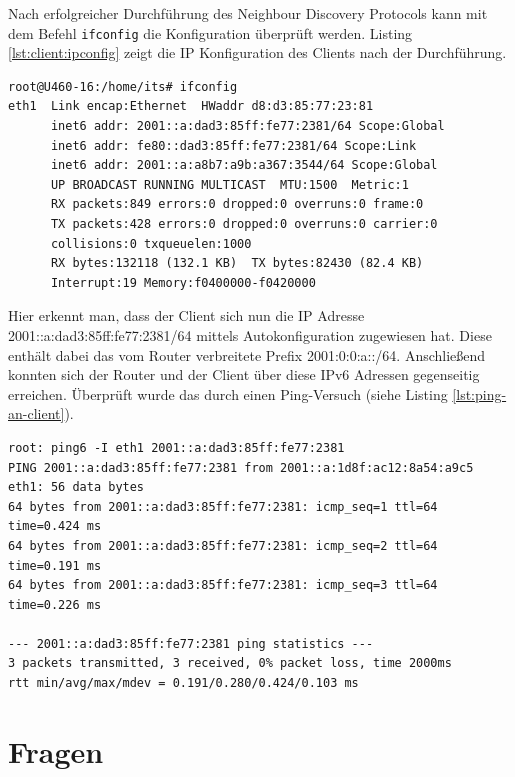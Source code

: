 \documentclass[a4paper,12pt]{article} %
\begin{document}
Nach erfolgreicher Durchführung des Neighbour Discovery Protocols kann mit dem Befehl \verb!ifconfig! die Konfiguration überprüft werden. Listing \ref{lst:client:ipconfig} zeigt die IP Konfiguration des Clients nach der Durchführung.

\begin{lstlisting}[style=code,caption={IP Konfiguration des Clients},label=lst:client:ipconfig]
root@U460-16:/home/its# ifconfig
eth1  Link encap:Ethernet  HWaddr d8:d3:85:77:23:81  
      inet6 addr: 2001::a:dad3:85ff:fe77:2381/64 Scope:Global
      inet6 addr: fe80::dad3:85ff:fe77:2381/64 Scope:Link
      inet6 addr: 2001::a:a8b7:a9b:a367:3544/64 Scope:Global
      UP BROADCAST RUNNING MULTICAST  MTU:1500  Metric:1
      RX packets:849 errors:0 dropped:0 overruns:0 frame:0
      TX packets:428 errors:0 dropped:0 overruns:0 carrier:0
      collisions:0 txqueuelen:1000 
      RX bytes:132118 (132.1 KB)  TX bytes:82430 (82.4 KB)
      Interrupt:19 Memory:f0400000-f0420000  
\end{lstlisting}

Hier erkennt man, dass der Client sich nun die IP Adresse 2001::a:dad3:85ff:fe77:2381/64 mittels Autokonfiguration zugewiesen hat. Diese enthält dabei das vom Router verbreitete Prefix 2001:0:0:a::/64.
Anschließend konnten sich der Router und der Client über diese IPv6 Adressen gegenseitig erreichen. Überprüft wurde das durch einen Ping-Versuch (siehe Listing \ref{lst:ping-an-client}).

\begin{lstlisting}[style=code,caption={Ping an Client},label=lst:ping-an-client]
root: ping6 -I eth1 2001::a:dad3:85ff:fe77:2381
PING 2001::a:dad3:85ff:fe77:2381 from 2001::a:1d8f:ac12:8a54:a9c5 eth1: 56 data bytes
64 bytes from 2001::a:dad3:85ff:fe77:2381: icmp_seq=1 ttl=64 time=0.424 ms
64 bytes from 2001::a:dad3:85ff:fe77:2381: icmp_seq=2 ttl=64 time=0.191 ms
64 bytes from 2001::a:dad3:85ff:fe77:2381: icmp_seq=3 ttl=64 time=0.226 ms

--- 2001::a:dad3:85ff:fe77:2381 ping statistics ---
3 packets transmitted, 3 received, 0% packet loss, time 2000ms
rtt min/avg/max/mdev = 0.191/0.280/0.424/0.103 ms
\end{lstlisting}

\section{Fragen}
\end{document}
